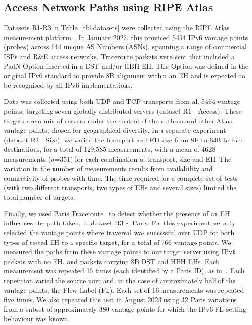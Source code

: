 \documentclass[conference]{IEEEtran}
\begin{document}
\subsection{Access Network Paths using RIPE Atlas}
\label{sec:ripe-methodology}

Datasets R1-R3 in Table~\ref{tbl:datasets} were collected using the RIPE Atlas
measurement platform~\cite{bajpai2015lessons}.  In January 2023, this provided 5464
IPv6 vantage points (probes) across 644 unique AS Numbers (ASNs), spanning a
range of commercial ISPs and R\&E access networks.  
Traceroute packets were sent that included a PadN Option inserted in a DST and/or HBH EH. This Option
was defined in the original IPv6 standard to provide 8B alignment within an EH
and is expected to be recognised by all IPv6 implementations.  

Data was collected using both UDP and TCP transports from all 5464 vantage
points, targeting seven globally distributed servers (dataset R1 - Access). These targets are a mix of servers under the control of the authors and other Atlas vantage points, chosen for geographical diversity. In a
separate experiment (dataset R2 - Size), we varied the transport and EH size from 8B to 64B to four destinations, for a total of 129,585 measurements, with a mean of 4628 measurements ($\sigma$=351) for each combination of transport, size and EH. The variation in the number of measurements results from availability and connectivity of probes with time. The time required for a complete set of tests (with two different transports, two types of EHs and several sizes) limited the total number of targets.


Finally, we used Paris Traceroute~\cite{augustin2006avoiding} to detect
whether the presence of an EH influences the path taken, in dataset R3~-~Paris. For this experiment we only
selected the vantage points where traversal was successful over UDP for both types
of tested EH to a specific target, for a total of 766 vantage points.
We measured the paths from these vantage points to our target server using IPv6 packets with no EH, and packets carrying 8B
DST and HBH EHs. Each measurement was repeated 16 times (each identified by  a
Paris ID), as in~\cite{augustin2006avoiding}. Each repetition varied the source
port and, in the case of approximately half of the vantage points, the Flow Label (FL).
Each set of 16 measurements was repeated five times.
We also repeated this test in August 2023 using 32 Paris variations from a subset of approximately 380 vantage points for which the IPv6 FL setting behaviour was known.
\end{document}
